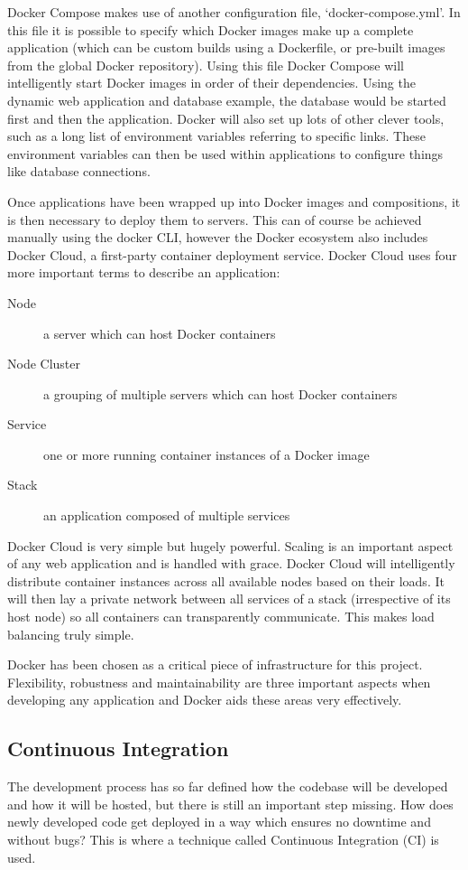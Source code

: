       Docker Compose makes use of another configuration file, `docker-compose.yml'. In this file it is possible to specify which Docker images make up a complete application (which can be custom builds using a Dockerfile, or pre-built images from the global Docker repository). Using this file Docker Compose will intelligently start Docker images in order of their dependencies. Using the dynamic web application and database example, the database would be started first and then the application. Docker will also set up lots of other clever tools, such as a long list of environment variables referring to specific links. These environment variables can then be used within applications to configure things like database connections.

      Once applications have been wrapped up into Docker images and compositions, it is then necessary to deploy them to servers. This can of course be achieved manually using the docker CLI, however the Docker ecosystem also includes Docker Cloud, a first-party container deployment service. Docker Cloud uses four more important terms to describe an application:

      \begin{description}
        \item[Node] a server which can host Docker containers
        \item[Node Cluster] a grouping of multiple servers which can host Docker containers
        \item[Service] one or more running container instances of a Docker image
        \item[Stack] an application composed of multiple services
      \end{description}

      Docker Cloud is very simple but hugely powerful. Scaling is an important aspect of any web application and is handled with grace. Docker Cloud will intelligently distribute container instances across all available nodes based on their loads. It will then lay a private network between all services of a stack (irrespective of its host node) so all containers can transparently communicate. This makes load balancing truly simple.

      Docker has been chosen as a critical piece of infrastructure for this project. Flexibility, robustness and maintainability are three important aspects when developing any application and Docker aids these areas very effectively.

    \subsection{Continuous Integration}
      The development process has so far defined how the codebase will be developed and how it will be hosted, but there is still an important step missing. How does newly developed code get deployed in a way which ensures no downtime and without bugs? This is where a technique called Continuous Integration (CI) is used.

